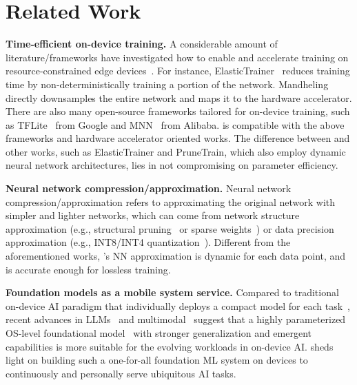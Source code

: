 \section{Related Work}
\noindent \textbf{Time-efficient on-device training.}
A considerable amount of literature/frameworks have investigated how to enable and accelerate training on resource-constrained edge devices~\cite{huang2023elastictrainer, xu2022mandheling, 10.1145/3295500.3356156, mercury2021sensys, 10.1145/3384419.3430716, zhu2023pockengine, tflite, tfjs, MNN}.
For instance, ElasticTrainer~\cite{huang2023elastictrainer} reduces training time by non-deterministically training a portion of the network.
Mandheling~\cite{xu2022mandheling} directly downsamples the entire network and maps it to the hardware accelerator.
There are also many open-source frameworks tailored for on-device training, such as TFLite~\cite{tflite} from Google and MNN~\cite{MNN} from Alibaba.
\sys is compatible with the above frameworks and hardware accelerator oriented works.
The difference between \sys and other works, such as ElasticTrainer and PruneTrain, which also employ dynamic neural network architectures, lies in \sys not compromising on parameter efficiency.

\noindent \textbf{Neural network compression/approximation.}
Neural network compression/approximation refers to approximating the original network with simpler and lighter networks, which can come from network structure approximation (e.g., structural pruning~\cite{torchpruninggithub, krishnan2019structural, AdaSpring, AdaEnlight} or sparse weights~\cite{tangandyang2023torchsparse}) or data precision approximation (e.g., INT8/INT4 quantization~\cite{frantar2023gptq, Zafrir_2019}).
Different from the aforementioned works, \sys's NN approximation is dynamic for each data point, and is accurate enough for lossless training.

\noindent \textbf{Foundation models as a mobile system service.}
Compared to traditional on-device AI paradigm that individually deploys a compact model for each task~\cite{yin2024llmservicemobiledevices, cai2018proxylessnas, cai2018proxylessnas, Fang_2018, lu2024smalllanguagemodelssurvey, xu2024surveyresourceefficientllmmultimodal, yin2024elmselasticizedlargelanguage}, recent advances in LLMs~\cite{zhou2023large, muennighoff2023crosslingual, BELLE, koala_blogpost_2023, brown2020language} and multimodal~\cite{tang2023anytoany, su2023pandagpt, radford2021learning, li2021align, li2022blip, li2023blip2} suggest that a highly parameterized 
OS-level foundational model~\cite{yuan2023rethinking, yang2023edgefm} with stronger generalization and emergent capabilities is more suitable for the evolving workloads in on-device AI.
\sys sheds light on building such a one-for-all foundation ML system on devices to continuously and personally serve ubiquitous AI tasks.

